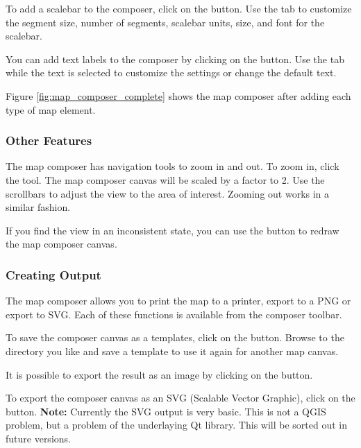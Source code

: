 To add a scalebar to the composer, click on the
button. Use the 
tab to customize the segment size, number of segments, scalebar units, size,
and font for the scalebar.

You can add text labels to the composer by clicking on the
button. Use the  tab
while the text is selected to customize the settings or change the default text.

Figure \ref{fig:map_composer_complete} shows the map composer after adding
each type of map element.

\subsubsection{Other Features}

The map composer has navigation tools to zoom in and out. To zoom in, click
the  tool. The map composer canvas will be scaled by a factor to 2. Use
the scrollbars to adjust the view to the area of interest. Zooming out works
in a similar fashion.

If you find the view in an inconsistent state, you can use the  button
to redraw the map composer canvas.

\subsubsection{Creating Output}

The map composer allows you to print the map to a printer, export to a PNG or
export to SVG. Each of these functions is available from the composer toolbar.

To save the composer canvas as a templates, click on the
button. Browse to the directory 
you like and save a template to use it again for another map canvas.

It is possible to export the result as an image by clicking on the
button. 

To export the composer canvas as an  SVG (Scalable Vector Graphic), click on
the 
button. \textbf{Note:}
Currently the SVG output is very basic. This is not a QGIS problem, but a
problem of the underlaying Qt library. This will be sorted out in future versions.
 
